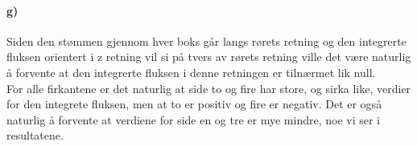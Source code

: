 \documentclass[11pt, A4paper,norsk]{article}
\begin{document}
		\paragraph{g)}
			\begin{flushleft}

Siden den stømmen gjennom hver boks går langs rørets retning og den integrerte fluksen orientert i z retning vil si på tvers av rørets retning ville det være naturlig å forvente at den integrerte fluksen i denne retningen er tilnærmet lik null. \\
For alle firkantene er det naturlig at side to og fire har store, og sirka like, verdier for den integrete fluksen, men at to er positiv og fire er negativ. Det er også naturlig å forvente at verdiene for side en og tre er mye mindre, noe vi ser i resultatene.
			\end{flushleft}
\end{document}

